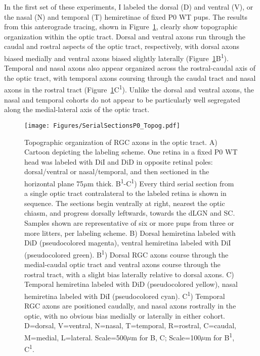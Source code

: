 In the first set of these experiments, I labeled the dorsal (D) and ventral (V), or the nasal (N) and temporal (T) hemiretinae of fixed P0 WT pups.
The results from this anterograde tracing, shown in Figure~\ref{Figures/SerialSectionsP0Topog}, clearly show topographic organization within the optic tract.
Dorsal and ventral axons run through the caudal and rostral aspects of the optic tract, respectively, with dorsal axons biased medially and ventral axons biased slightly laterally (Figure~\ref{Figures/SerialSectionsP0Topog}B\textsuperscript{1}).
Temporal and nasal axons also appear organized across the rostral-caudal axis of the optic tract, with temporal axons coursing through the caudal tract and nasal axons in the rostral tract (Figure~\ref{Figures/SerialSectionsP0Topog}C\textsuperscript{1}).
Unlike the dorsal and ventral axons, the nasal and temporal cohorts do not appear to be particularly well segregated along the medial-lateral axis of the optic tract.
\begin{figure}[hbtp]
    \begin{center}
        \texttt{[image: Figures/SerialSectionsP0\_Topog.pdf]}
        \caption[Topographic organization of RGC axons in the optic tract.]
        {Topographic organization of RGC axons in the optic tract.
        A) Cartoon depicting the labeling scheme.
        One retina in a fixed P0 WT head was labeled with DiI and DiD in opposite retinal poles: dorsal/ventral or nasal/temporal, and then sectioned in the horizontal plane 75$\mu$m thick.
        B\textsuperscript{1}-C\textsuperscript{1}) Every third serial section from a single optic tract contralateral to the labeled retina is shown in sequence.
        The sections begin ventrally at right, nearest the optic chiasm, and progress dorsally leftwards, towards the dLGN and SC.
        Samples shown are representative of six or more pups from three or more litters, per labeling scheme. %
        B) Dorsal hemiretina labeled with DiD (pseudocolored magenta), ventral hemiretina labeled with DiI (pseudocolored green).
        B\textsuperscript{1}) Dorsal RGC axons course through the medial-caudal optic tract and ventral axons course through the rostral tract, with a slight bias laterally relative to dorsal axons.
        C) Temporal hemiretina labeled with DiD (pseudocolored yellow), nasal hemiretina labeled with DiI (pseudocolored cyan).
        C\textsuperscript{1}) Temporal RGC axons are positioned caudally, and nasal axons rostrally in the optic, with no obvious bias medially or laterally in either cohort.
        D=dorsal, V=ventral, N=nasal, T=temporal, R=rostral, C=caudal, M=medial, L=lateral.
        Scale=500$\mu$m for B, C; Scale=100$\mu$m for B\textsuperscript{1}, C\textsuperscript{1}.}
        \label{Figures/SerialSectionsP0Topog}
    \end{center}
\end{figure}

